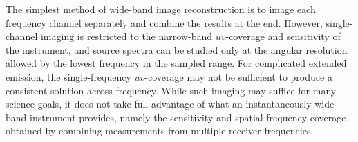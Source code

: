 \documentclass[structabstract]{stylefiles/aa}
\begin{document}


%

The simplest method of wide-band image reconstruction is to image 
each frequency channel separately and combine the results at the end. 
However, single-channel imaging is restricted to the narrow-band
$uv$-coverage and sensitivity of the instrument, and source 
spectra can be studied only at the
angular resolution allowed by the lowest frequency in the sampled range.
For complicated extended emission, the single-frequency $uv$-coverage
may not be sufficient to produce a consistent solution across frequency.
While such imaging may suffice for many science goals, it does not
take full advantage of what an instantaneously wide-band instrument provides,
namely the sensitivity and spatial-frequency coverage obtained by 
combining measurements from multiple receiver frequencies.
%
\end{document}
